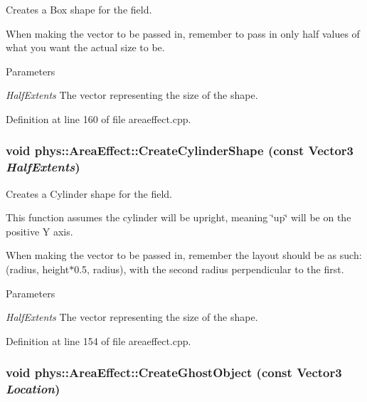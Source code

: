 Creates a Box shape for the field. 

When making the vector to be passed in, remember to pass in only half values of what you want the actual size to be. 
\begin{DoxyParams}{Parameters}
\item[{\em HalfExtents}]The vector representing the size of the shape. \end{DoxyParams}


Definition at line 160 of file areaeffect.cpp.

\hypertarget{classphys_1_1AreaEffect_a5bd39788f8d5eb04cd24becfa5153a6a}{
\subsubsection[{CreateCylinderShape}]{\setlength{\rightskip}{0pt plus 5cm}void phys::AreaEffect::CreateCylinderShape (const {\bf Vector3} {\em HalfExtents})}}
\label{d4/d55/classphys_1_1AreaEffect_a5bd39788f8d5eb04cd24becfa5153a6a}


Creates a Cylinder shape for the field. 

This function assumes the cylinder will be upright, meaning \char`\"{}up\char`\"{} will be on the positive Y axis. \par
 When making the vector to be passed in, remember the layout should be as such: (radius, height$\ast$0.5, radius), with the second radius perpendicular to the first. 
\begin{DoxyParams}{Parameters}
\item[{\em HalfExtents}]The vector representing the size of the shape. \end{DoxyParams}


Definition at line 154 of file areaeffect.cpp.

\hypertarget{classphys_1_1AreaEffect_afe30d4ffa4e16dfb151446960dad61ac}{
\subsubsection[{CreateGhostObject}]{\setlength{\rightskip}{0pt plus 5cm}void phys::AreaEffect::CreateGhostObject (const {\bf Vector3} {\em Location})}}
\label{d4/d55/classphys_1_1AreaEffect_afe30d4ffa4e16dfb151446960dad61ac}


